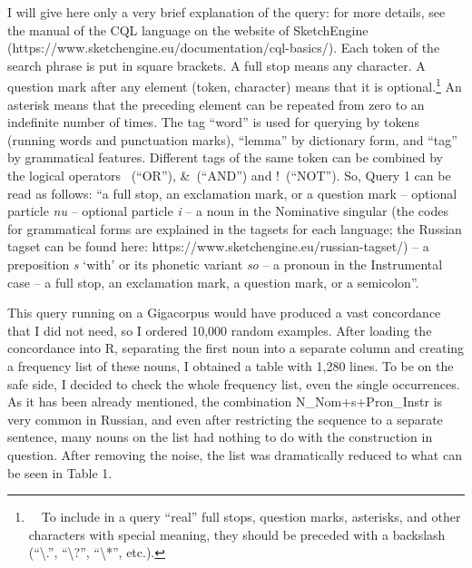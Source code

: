 \documentclass[12pt]{article}
\newenvironment{styleStandard}{\setlength\leftskip{0cm}\setlength\rightskip{0cm plus 1fil}\setlength\parindent{0cm}\setlength\parfillskip{0pt plus 1fil}\setlength\parskip{0in plus 1pt}\writerlistparindent\writerlistleftskip\leavevmode\normalfont\normalsize\writerlistlabel\ignorespaces}{\unskip\vspace{0.111in plus 0.0111in}\par}
\newcommand\writerlistleftskip{}
\newcommand\writerlistparindent{}
\newcommand\writerlistlabel{}
\begin{document}
\begin{styleStandard}
I will give here only a very brief explanation of the query: for more details, see the manual of the CQL language on the website of SketchEngine (https://www.sketchengine.eu/documentation/cql-basics/). Each token of the search phrase is put in square brackets. A full stop means any character. A question mark after any element (token, character) means that it is optional.\footnote{\ \ To include in a query “real” full stops, question marks, asterisks, and other characters with special meaning, they should be preceded with a backslash (“{\textbackslash}.”, “{\textbackslash}?”, “{\textbackslash}*”, etc.).} An asterisk means that the preceding element can be repeated from zero to an indefinite number of times. The tag “word” is used for querying by tokens (running words and punctuation marks), “lemma” by dictionary form, and “tag” by grammatical features. Different tags of the same token can be combined by the logical operators {\textbar}~(“OR”), \&~(“AND”) and !~(“NOT”). So, Query 1 can be read as follows: “a full stop, an exclamation mark, or a question mark – optional particle \textit{nu} – optional particle \textit{i} – a noun in the Nominative singular (the codes for grammatical forms are explained in the tagsets for each language; the Russian tagset can be found here: https://www.sketchengine.eu/russian-tagset/) – a preposition \textit{s} ‘with’ or its phonetic variant \textit{so} – a pronoun in the Instrumental case – a full stop, an exclamation mark, a question mark, or a semicolon”.
\end{styleStandard}

\begin{styleStandard}
This query running on a Gigacorpus would have produced a vast concordance that I did not need, so I ordered 10,000 random examples. After loading the concordance into R, separating the first noun into a separate column and creating a frequency list of these nouns, I obtained a table with 1,280 lines. To be on the safe side, I decided to check the whole frequency list, even the single occurrences. As it has been already mentioned, the combination N\_Nom+s+Pron\_Instr is very common in Russian, and even after restricting the sequence to a separate sentence, many nouns on the list had nothing to do with the construction in question. After removing the noise, the list was dramatically reduced to what can be seen in Table 1.
\end{styleStandard}
\end{document}
